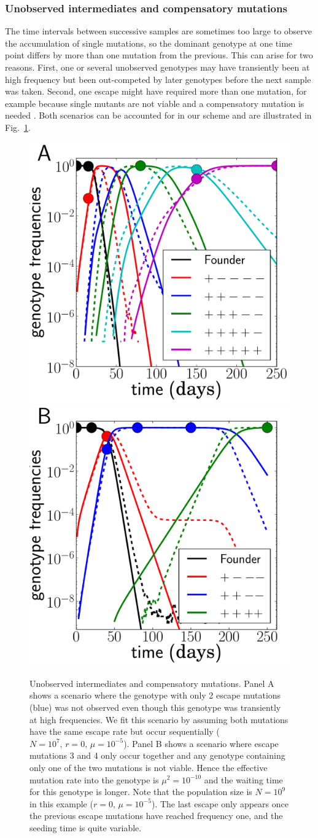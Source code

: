 \documentclass{frontiers}
\newcommand{\FIG}[1]{Fig.~\ref{fig:#1}}
\begin{document}
\subsubsection{Unobserved intermediates and compensatory mutations}
The time intervals between successive samples are sometimes too large to observe
the accumulation of single mutations, so the dominant genotype at one
time point differs by more than one mutation from the previous. This can arise
for two reasons. First, one or several unobserved genotypes may have transiently been at
high frequency but been out-competed by later genotypes before the next sample
was taken.
Second, one escape might have required more than one mutation, for 
example because
single mutants are not viable and a compensatory mutation is needed
\citep{read_stochastic_2012}. Both scenarios can be accounted for in our scheme
and are illustrated in \FIG{degenerate}.

\begin{figure}[htp]
\begin{center}
  \includegraphics[width=0.3\columnwidth]{figures_manuscript/sequential_degen_traj_log.pdf}
  \includegraphics[width=0.3\columnwidth]{figures_manuscript/sequential_valley_traj_fit_log.pdf}
  \caption[labelInTOC]{Unobserved intermediates and compensatory mutations.
  Panel A shows a scenario where the genotype with only 2 escape
  mutations (blue)
  was not observed even though this genotype was transiently at high frequencies.
  We fit this scenario by assuming both mutations have the same escape rate but
  occur sequentially ($N=10^{7},\, r=0,\, \mu=10^{-5}$). 
  Panel B shows a scenario where escape mutations 3 and 4
  only occur together and any genotype containing only one of the two mutations
  is not viable. Hence the effective mutation rate into the genotype is
  $\mu^2=10^{-10}$ and the waiting time for this genotype is longer. Note that
  the population size is $N=10^9$ in this example ($r=0,\, \mu=10^{-5}$). The last escape only appears
  once the previous escape mutations have reached frequency one, and the seeding
  time is quite variable.}
  \label{fig:degenerate}
\end{center}
\end{figure}
\end{document}
